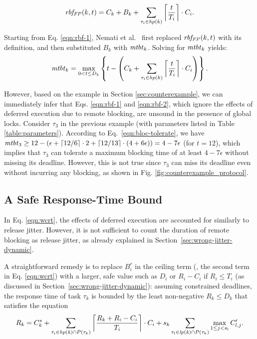 \begin{equation}
\label{eqn:rbf-2}
\mathit{rbf_{FP}}(k,t) = C_k + B_k + \sum_{\tau_i \in \mathit{hp}(k)} \left \lceil \frac{t}{T_i} \right \rceil \cdot C_i.
\end{equation}

Starting from Eq. \eqref{eqn:rbf-1}, Nemati et al.~\cite{NBN:11} first  replaced $\mathit{rbf_{FP}}(k,t)$ with its definition, and then substituted  $B_k$ with $\mathit{mtbt}_k$. Solving for $\mathit{mtbt}_k$ yields:
\begin{equation}
\label{eqn:bloc-tolerate}
\mathit{mtbt}_k = \max_{0<t \leq D_k} \left\{ t - \left( C_k + \sum_{\tau_i \in \mathit{hp}(k)} \left \lceil \frac{t}{T_i} \right \rceil \cdot C_i \right) \right\}.
\end{equation}

However, based on the example in Section \ref{sec:counterexample}, we can immediately infer that Eqs. \eqref{eqn:rbf-1} and \eqref{eqn:rbf-2}, which ignore the effects of deferred execution due to remote blocking, are unsound in the presence of global locks. Consider $\tau_3$ in the previous example (with parameters listed in Table \ref{table:parameters}). According to Eq.~\eqref{eqn:bloc-tolerate}, we have $\mathit{mtbt}_3 \geq 12 - (\epsilon + \lceil 12 / 6 \rceil \cdot 2 + \lceil 12 / 13 \rceil \cdot (4+6\epsilon)) = 4-7\epsilon$ (for $t=12$), which implies that $\tau_3$ can tolerate a maximum blocking time of at least $4-7\epsilon$ without missing its deadline. However, this is not true since $\tau_3$ can miss its deadline even without incurring any blocking, as shown in Fig. \ref{fig:counterexample_protocol}. 

\subsection{A Safe Response-Time Bound}
\label{sec:safe_bound}

In Eq. \eqref{eqn:wcrt}, the effects of deferred execution  are accounted for similarly to release jitter. However, it is not sufficient to count the duration of remote blocking as release jitter, as already explained in Section~\ref{sec:wrong-jitter-dynamic}.

A straightforward remedy is to replace $B_i^r$ in the ceiling term (\ie, the second term in Eq. \eqref{eqn:wcrt}) with a larger, safe value such as $D_i$  or $R_i - C_i$ if $R_i \leq T_i$ (as discussed in Section~\ref{sec:wrong-jitter-dynamic}): assuming constrained deadlines, the response time of task $\tau_k$ is bounded by the least non-negative $R_k \leq D_k$ that satisfies the equation
\begin{equation}
\label{eqn:wcrt-pfp-fixed}
R_k = C_k^{\ast} + \sum_{\tau_i \in \mathit{hp(k)} \cap P(\tau_k)} \left \lceil \frac{R_k + R_i - C_i}{T_i} \right \rceil \cdot C_i + s_k \sum_{\tau_l \in \mathit{lp(k)} \cap P(\tau_k)} \max_{1 \leq j < s_l} C_{l,j}^{\prime}.
\end{equation}


